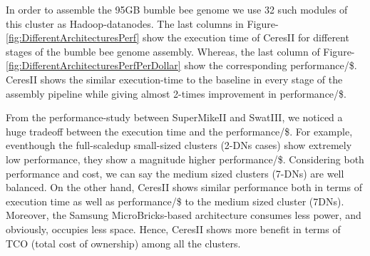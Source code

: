 \documentclass[conference]{IEEEtran}
\begin{document}
In order to assemble the 95GB bumble bee genome we use 32 such modules of this cluster as Hadoop-datanodes.
The last columns in Figure-\ref{fig:DifferentArchitecturesPerf} show the execution time of CeresII for different stages of the bumble bee genome assembly. Whereas, the last column of Figure-\ref{fig:DifferentArchitecturesPerfPerDollar} show the corresponding performance/\$.
CeresII shows the similar execution-time to the baseline in every stage of the assembly pipeline while giving almost 2-times improvement in performance/\$.

From the performance-study between SuperMikeII and SwatIII, we noticed a huge tradeoff between the execution time and the performance/\$. 
For example, eventhough the full-scaledup small-sized clusters (2-DNs cases) show extremely low performance, they show a magnitude higher performance/\$. Considering both performance and cost, we can say the medium sized clusters (7-DNs) are well balanced.
On the other hand, CeresII shows similar performance both in terms of execution time as well as performance/\$ to the medium sized cluster (7DNs). Moreover, the Samsung MicroBricks-based architecture consumes less power, and obviously, occupies less space. Hence, CeresII shows more benefit in terms of TCO (total cost of ownership) among all the clusters.


\end{document}
